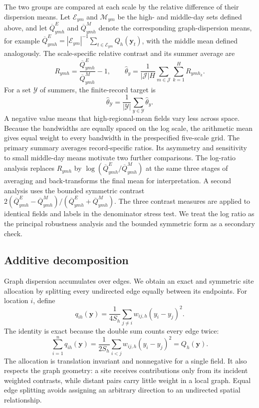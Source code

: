 \documentclass[namedate,webpdf,modern,mediumone]{oup-authoring-template}
\begin{document}
The two groups are compared at each scale by the relative difference of their
dispersion means. Let $\mathcal E_{ym}$ and $\mathcal M_{ym}$ be the high- and
middle-day sets defined above, and let $\overline Q^{E}_{ymh}$ and
$\overline Q^{M}_{ymh}$ denote the corresponding graph-dispersion means, for example
$\overline Q^{E}_{ymh}=|\mathcal E_{ym}|^{-1}
\sum_{t\in\mathcal E_{ym}}Q_h(\mathbf y_t)$, with the middle mean
defined analogously.
The scale-specific relative contrast and its summer average are
\begin{equation}
 R_{ymh}=\frac{\overline Q^{E}_{ymh}}{\overline Q^{M}_{ymh}}-1,
 \qquad
 \widehat\theta_y=\frac{1}{|\mathcal J|H}\sum_{m\in\mathcal J}\sum_{k=1}^{H}R_{ymh_k}.
 \label{eq:relative}
\end{equation}
For a set $\mathcal Y$ of summers, the finite-record target is
\begin{equation}
 \widehat\theta_{\mathcal Y}
 =\frac{1}{|\mathcal Y|}\sum_{y\in\mathcal Y}\widehat\theta_y.
\label{eq:record-estimand}
\end{equation}
A negative value means that high-regional-mean fields vary less across space.
Because the bandwidths are equally spaced on the log scale, the arithmetic
mean gives equal weight to every bandwidth in the prespecified five-scale
grid. The primary summary averages record-specific ratios. Its asymmetry
and sensitivity to small middle-day means motivate two further comparisons. The
log-ratio analysis replaces $R_{ymh}$ by
$\log(\overline Q^{E}_{ymh}/\overline Q^{M}_{ymh})$ at the same three stages
of averaging and back-transforms the final mean for interpretation. A second
analysis uses the bounded symmetric contrast
$2(\overline Q^{E}_{ymh}-\overline Q^{M}_{ymh})/
(\overline Q^{E}_{ymh}+\overline Q^{M}_{ymh})$. The three contrast measures are
applied to identical fields and labels in the denominator stress test. We
treat the log ratio as the principal robustness analysis and the bounded
symmetric form as a secondary check.

\subsection{Additive decomposition}

Graph dispersion accumulates over edges. We obtain an exact and symmetric site
allocation by splitting every undirected edge equally between its endpoints. For location $i$, define
\begin{equation}
 q_{ih}(\mathbf y)=\frac{1}{4S_h}\sum_{j\ne i}
 w_{ij,h}(y_i-y_j)^2.
 \label{eq:node-energy}
\end{equation}
The identity is exact because the double sum counts every edge twice:
\begin{equation}
 \sum_{i=1}^n q_{ih}(\mathbf y)
 =\frac{1}{2S_h}\sum_{i<j}w_{ij,h}(y_i-y_j)^2
 =Q_h(\mathbf y).
 \label{eq:node-sum}
\end{equation}
The allocation is translation invariant and nonnegative for a single field.
It also respects the graph geometry: a site receives contributions only from
its incident weighted contrasts, while distant pairs carry little weight in a
local graph. Equal edge splitting avoids assigning an arbitrary direction to
an undirected spatial relationship.
\end{document}
